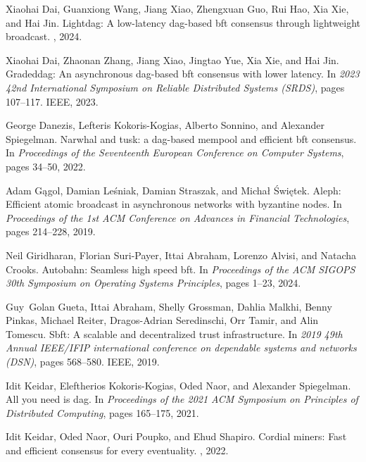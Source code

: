 \begin{thebibliography}{10}
Xiaohai Dai, Guanxiong Wang, Jiang Xiao, Zhengxuan Guo, Rui Hao, Xia Xie, and
  Hai Jin.
\newblock Lightdag: A low-latency dag-based bft consensus through lightweight
  broadcast.
, 2024.

Xiaohai Dai, Zhaonan Zhang, Jiang Xiao, Jingtao Yue, Xia Xie, and Hai Jin.
\newblock Gradeddag: An asynchronous dag-based bft consensus with lower
  latency.
\newblock In {\em 2023 42nd International Symposium on Reliable Distributed
  Systems (SRDS)}, pages 107--117. IEEE, 2023.

George Danezis, Lefteris Kokoris-Kogias, Alberto Sonnino, and Alexander
  Spiegelman.
\newblock Narwhal and tusk: a dag-based mempool and efficient bft consensus.
\newblock In {\em Proceedings of the Seventeenth European Conference on
  Computer Systems}, pages 34--50, 2022.

Adam G{\k{a}}gol, Damian Le{\'s}niak, Damian Straszak, and Micha{\l}
  {\'S}wi{\k{e}}tek.
\newblock Aleph: Efficient atomic broadcast in asynchronous networks with
  byzantine nodes.
\newblock In {\em Proceedings of the 1st ACM Conference on Advances in
  Financial Technologies}, pages 214--228, 2019.

Neil Giridharan, Florian Suri-Payer, Ittai Abraham, Lorenzo Alvisi, and Natacha
  Crooks.
\newblock Autobahn: Seamless high speed bft.
\newblock In {\em Proceedings of the ACM SIGOPS 30th Symposium on Operating
  Systems Principles}, pages 1--23, 2024.

Guy~Golan Gueta, Ittai Abraham, Shelly Grossman, Dahlia Malkhi, Benny Pinkas,
  Michael Reiter, Dragos-Adrian Seredinschi, Orr Tamir, and Alin Tomescu.
\newblock Sbft: A scalable and decentralized trust infrastructure.
\newblock In {\em 2019 49th Annual IEEE/IFIP international conference on
  dependable systems and networks (DSN)}, pages 568--580. IEEE, 2019.

Idit Keidar, Eleftherios Kokoris-Kogias, Oded Naor, and Alexander Spiegelman.
\newblock All you need is dag.
\newblock In {\em Proceedings of the 2021 ACM Symposium on Principles of
  Distributed Computing}, pages 165--175, 2021.

Idit Keidar, Oded Naor, Ouri Poupko, and Ehud Shapiro.
\newblock Cordial miners: Fast and efficient consensus for every eventuality.
, 2022.


\end{thebibliography}
